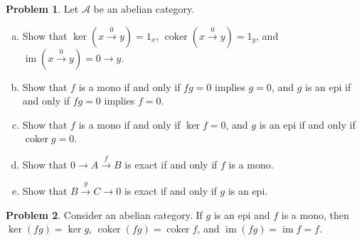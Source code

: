 \documentclass[11pt]{article}
\DeclareMathOperator{\coker}{coker}
\DeclareMathOperator{\im}{im}
\theoremstyle{definition}
\newtheorem{problem}{Problem}
\begin{document}
\vfill

\begin{problem} Let $\mathcal{A}$ be an abelian category.
	\begin{enumerate}[a)]
		\item Show that $\ker(x \xrightarrow{0} y) = 1_x$,  $\coker(x \xrightarrow{0} y) = 1_y$, and $\im(x \xrightarrow{0} y) = 0 \longrightarrow y$.
		\item Show that $f$ is a mono if and only if $fg = 0$ implies $g = 0$, and $g$ is an epi if and only if $fg = 0$ implies $f = 0$.
		\item Show that $f$ is a mono if and only if $\ker f = 0$, and $g$ is an epi if and only if $\coker g = 0$.
		\item Show that $0 \longrightarrow A \xrightarrow{\, f \,} B$ is exact if and only if $f$ is a mono.
		\item Show that $B \xrightarrow{\, g \,} C \longrightarrow 0$ is exact if and only if $g$ is an epi.
	\end{enumerate}
\end{problem}



\vfill

\begin{problem}
Consider an abelian category. If $g$ is an epi and $f$ is a mono, then $\ker (fg) = \ker g$, $\coker(fg) = \coker f$, and $\im (fg) = \im f = f$.
\end{problem}


\newpage


\noindent
{} 

\vspace{1em}
\end{document}
